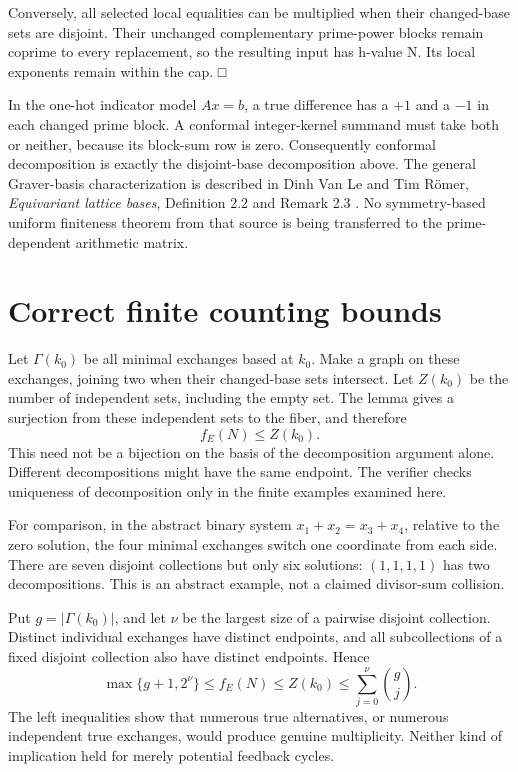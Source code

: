Conversely, all selected local equalities can be multiplied when their changed-base sets are disjoint. Their unchanged complementary prime-power blocks remain coprime to every replacement, so the resulting input has h-value N. Its local exponents remain within the cap. □

In the one-hot indicator model \(Ax=b\), a true difference has a \(+1\) and a \(-1\) in each changed prime block. A conformal integer-kernel summand must take both or neither, because its block-sum row is zero. Consequently conformal decomposition is exactly the disjoint-base decomposition above. The general Graver-basis characterization is described in Dinh Van Le and Tim Römer, \emph{Equivariant lattice bases}, Definition 2.2 and Remark 2.3 \cite{graver}. No symmetry-based uniform finiteness theorem from that source is being transferred to the prime-dependent arithmetic matrix.

\section{Correct finite counting bounds}\label{exchange:correct-finite-counting-bounds}

Let \(\Gamma(k_0)\) be all minimal exchanges based at \(k_0\). Make a graph on these exchanges, joining two when their changed-base sets intersect. Let \(Z(k_0)\) be the number of independent sets, including the empty set. The lemma gives a surjection from these independent sets to the fiber, and therefore \[
\boxed{f_E(N)\le Z(k_0).}\tag{2}
\] This need not be a bijection on the basis of the decomposition argument alone. Different decompositions might have the same endpoint. The verifier checks uniqueness of decomposition only in the finite examples examined here.

For comparison, in the abstract binary system \(x_1+x_2=x_3+x_4\), relative to the zero solution, the four minimal exchanges switch one coordinate from each side. There are seven disjoint collections but only six solutions: \((1,1,1,1)\) has two decompositions. This is an abstract example, not a claimed divisor-sum collision.

Put \(g=|\Gamma(k_0)|\), and let \(\nu\) be the largest size of a pairwise disjoint collection. Distinct individual exchanges have distinct endpoints, and all subcollections of a fixed disjoint collection also have distinct endpoints. Hence \[
\boxed{\max\{g+1,2^\nu\}\le f_E(N)\le Z(k_0)
\le\sum_{j=0}^{\nu}\binom gj.}\tag{3}
\] The left inequalities show that numerous true alternatives, or numerous independent true exchanges, would produce genuine multiplicity. Neither kind of implication held for merely potential feedback cycles.

